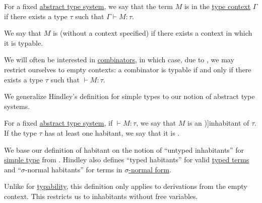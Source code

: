 \begin{definition}\label{def:typability}
  For a fixed \hyperref[def:abstract_type_system]{abstract type system}, we say that the term \( M \) is  in the \hyperref[def:type_context]{type context} \( \Gamma \) if there exists a type \( \tau \) such that \( \Gamma \vdash M: \tau \).

  We say that \( M \) is  (without a context specified) if there exists a context in which it is typable.
\end{definition}
\begin{comments}
  \item We will often be interested in \hyperref[def:lambda_combinator]{combinators}, in which case, due to , we may restrict ourselves to empty contexts: a combinator is typable if and only if there exists a type \( \tau \) such that \( {}\vdash M: \tau \).

  \item We generalize Hindley's definition for simple types to our notion of abstract type systems.
\end{comments}

\begin{definition}\label{def:type_habitation}
  For a fixed \hyperref[def:abstract_type_system]{abstract type system}, if \( {}\vdash M: \tau \), we say that \( M \) is an \term[en=untyped inhabitant (\cite[8A1]{Hindley1997BasicSTT})]{inhabitant} of \( \tau \). If the type \( \tau \) has at least one habitant, we say that it is .
\end{definition}
\begin{comments}
  \item We base our definition of habitant on the notion of \enquote{untyped inhabitants} for \hyperref[def:simple_type]{simple type} from \cite[def. 8A1]{Hindley1997BasicSTT}. Hindley also defines \enquote{typed habitants} for valid \hyperref[def:typed_lambda_term]{typed terms} and \enquote{\( \sigma \)-normal habitants} for terms in \hyperref[def:lambda_term_normal_form]{\( \sigma \)-normal form}.

  \item Unlike for \hyperref[def:typability]{typability}, this definition only applies to derivations from the empty context. This restricts us to inhabitants without free variables.
\end{comments}

